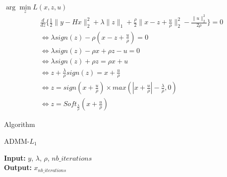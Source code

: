 \begin{frame}{$\arg\min\limits_{z} {L(x, z, u)}$}
\begin{align*}
&\frac{d}{dz} \{
    \frac{1}{2} \lVert y - Hx \rVert_{2}^{2} 
    + \lambda \lVert z \rVert_{1} 
    + \frac{\rho}{2} \lVert x - z + \frac{u}{\rho} \rVert_{2}^{2} 
    - \frac{\lVert u \rVert_{2}^{2}}{2\rho}
\} = 0 \\
&\iff \lambda sign(z) - \rho (x - z + \frac{u}{\rho})  = 0 \\
&\iff \lambda sign(z) - \rho x + \rho z - u  = 0 \\
&\iff \lambda sign(z) + \rho z  = \rho x + u \\
&\iff  z + \frac{\lambda}{\rho} sign(z) = x + \frac{u}{\rho} \\
&\iff  z = sign(x + \frac{u}{\rho}) 
\times max(|x + \frac{u}{\rho}| 
- \frac{\lambda}{\rho}, 0) \\
&\iff  z = Soft_{\frac{\lambda}{\rho}}(x + \frac{u}{\rho})
\end{align*}
\end{frame}

\begin{frame}{Algorithm}
\begin{algorithm}[H]
    \caption{ADMM-$L_{1}$} %
    \begin{algorithmic}[1]
        \newline
        \textbf{Input:} $y$, $\lambda$, $\rho$, $nb\_iterations$ \\
        \textbf{Output:} $x_{nb\_iterations}$
        \EndFor
        \EndProcedure
    \end{algorithmic}
\end{algorithm}
\end{frame}

